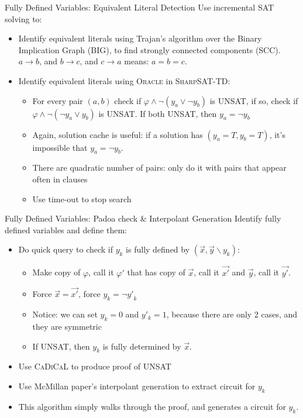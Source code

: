 \documentclass[aspectratio=169]{beamer}
\begin{document}
\begin{frame}{Fully Defined Variables: Equivalent Literal Detection}
Use incremental SAT solving to:
\begin{itemize}
    \item Identify equivalent literals using Trajan's algorithm over the
        Binary Implication Graph (BIG), to find strongly connected components (SCC).
        $a\rightarrow b$, and $b\rightarrow c$, and $c\rightarrow a$ means:
        $a = b = c$.
    \item Identify equivalent literals using \textsc{Oracle}
        in \textsc{SharpSAT-TD}:
        \begin{itemize}
            \item For every pair $(a,b)$ check if $\varphi \land \neg (y_a \lor \neg
                y_b)$ is UNSAT, if so, check if $\varphi \land \neg (\neg y_a \lor
                y_b)$ is UNSAT. If both UNSAT, then $y_a = \neg y_b$
            \item Again, solution cache is useful: if a solution has $(y_a = T,
                y_b = T)$, it's impossible that $y_a = \neg y_b$.
            \item There are quadratic number of pairs: only do it with pairs that
                appear often in clauses
            \item Use time-out to stop search
        \end{itemize}
\end{itemize}
\end{frame}

\begin{frame}{Fully Defined Variables: Padoa check \& Interpolant Generation}
Identify fully defined variables and define them:
\begin{itemize}
    \item Do quick query to check if $y_k$ is fully defined by $(\vec{x},
        \vec{y} \backslash y_k)$:
        \begin{itemize}
        \item Make copy of $\varphi$, call it $\varphi'$ that has copy of
            $\vec{x}$, call it $\vec{x'}$ and $\vec{y}$, call it $\vec{y'}$.
        \item Force $\vec{x} = \vec{x'}$, force $y_k = \neg {y'}_k$
        \item Notice: we can set $y_k=0$ and $y'_k=1$, because
            there are only 2 cases, and they are symmetric
        \item If UNSAT, then $y_k$ is fully determined by $\vec{x}$.
        \end{itemize}
    \item Use \textsc{CaDiCaL} to produce proof of UNSAT
    \item Use McMillan paper's interpolant generation to extract circuit for
        $y_k$
    \item This algorithm simply walks through the proof,
        and generates a circuit for $y_k$.
\end{itemize}
\end{frame}
\end{document}
